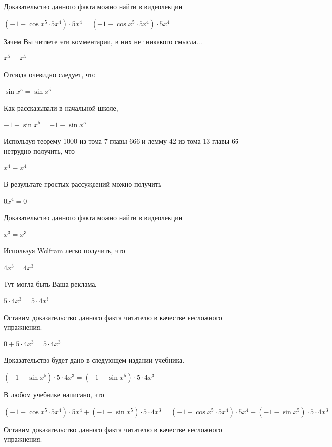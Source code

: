 \documentclass[12pt,a4paper,fleqn]{article}
\theoremstyle{definition}
\begin{document}
Доказательство данного факта можно найти в \href{https://www.youtube.com/watch?v=dQw4w9WgXcQ}{видеолекции} 

$( -1  - \cos{ x }^{ 5 } \cdot  5 { x }^{ 4 }) \cdot  5 { x }^{ 4 } = ( -1  - \cos{ x }^{ 5 } \cdot  5 { x }^{ 4 }) \cdot  5 { x }^{ 4 }$

Зачем Вы читаете эти комментарии, в них нет никакого смысла... 

${ x }^{ 5 } = { x }^{ 5 }$

Отсюда очевидно следует, что 

$\sin{ x }^{ 5 } = \sin{ x }^{ 5 }$

Как рассказывали в начальной школе, 

$ -1  - \sin{ x }^{ 5 } =  -1  - \sin{ x }^{ 5 }$

Используя теорему 1000 из тома 7 главы 666 и лемму 42 из тома 13 главы 66 нетрудно получить, что 

${ x }^{ 4 } = { x }^{ 4 }$

В результате простых рассуждений можно получить 

$ 0 { x }^{ 4 } =  0 $

Доказательство данного факта можно найти в \href{https://www.youtube.com/watch?v=dQw4w9WgXcQ}{видеолекции} 

${ x }^{ 3 } = { x }^{ 3 }$

Используя Wolfram легко получить, что 

$ 4 { x }^{ 3 } =  4 { x }^{ 3 }$

Тут могла быть Ваша реклама. 

$ 5  \cdot  4 { x }^{ 3 } =  5  \cdot  4 { x }^{ 3 }$

Оставим доказательство данного факта читателю в качестве несложного упражнения. 

$ 0  +  5  \cdot  4 { x }^{ 3 } =  5  \cdot  4 { x }^{ 3 }$

Доказательство будет дано в следующем издании учебника. 

$( -1  - \sin{ x }^{ 5 }) \cdot  5  \cdot  4 { x }^{ 3 } = ( -1  - \sin{ x }^{ 5 }) \cdot  5  \cdot  4 { x }^{ 3 }$

В любом учебнике написано, что 

$( -1  - \cos{ x }^{ 5 } \cdot  5 { x }^{ 4 }) \cdot  5 { x }^{ 4 } + ( -1  - \sin{ x }^{ 5 }) \cdot  5  \cdot  4 { x }^{ 3 } = ( -1  - \cos{ x }^{ 5 } \cdot  5 { x }^{ 4 }) \cdot  5 { x }^{ 4 } + ( -1  - \sin{ x }^{ 5 }) \cdot  5  \cdot  4 { x }^{ 3 }$

Оставим доказательство данного факта читателю в качестве несложного упражнения. 
\end{document}

